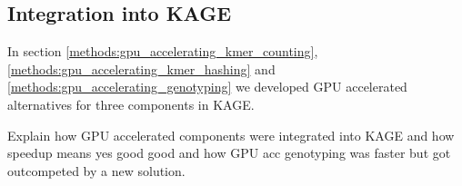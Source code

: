 \subsection{Integration into KAGE} \label{methods:integration_into_kage}
In section \ref{methods:gpu_accelerating_kmer_counting}, \ref{methods:gpu_accelerating_kmer_hashing} and \ref{methods:gpu_accelerating_genotyping} we developed GPU accelerated alternatives for three components in KAGE.

Explain how GPU accelerated components were integrated into KAGE and how speedup means yes good good and how GPU acc genotyping was faster but got outcompeted by a new solution.
